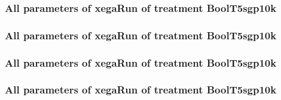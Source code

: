 \documentclass[18pt,c]{beamer}
\begin{document}

 \begin{frame}
 \fontsize{8pt}{9pt}\selectfont
 \frametitle{  All parameters of xegaRun of treatment BoolT5sgp10k 
 }

 \label{ExpFtParmTable046.tex}  
 \end{frame}


 \begin{frame}
 \fontsize{8pt}{9pt}\selectfont
 \frametitle{  All parameters of xegaRun of treatment BoolT5sgp10k 
 }

 \label{ExpFtParmTable047.tex}  
 \end{frame}


 \begin{frame}
 \fontsize{8pt}{9pt}\selectfont
 \frametitle{  All parameters of xegaRun of treatment BoolT5sgp10k 
 }

 \label{ExpFtParmTable048.tex}  
 \end{frame}


 \begin{frame}
 \fontsize{8pt}{9pt}\selectfont
 \frametitle{  All parameters of xegaRun of treatment BoolT5sgp10k 
 }

 \label{ExpFtParmTable049.tex}  
 \end{frame}

\end{document}
